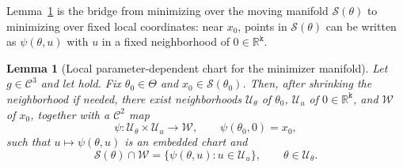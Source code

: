 \documentclass{article}
\theoremstyle{normaltheorem}
\newtheorem{lemma}[lemma]{Lemma}
\newcommand{\dimk}{\texttt{k}}
\newcommand{\R}{\mathbb{R}}
\newcommand{\calS}{\mathcal{S}}
\begin{document}
	Lemma~\ref{lem:parametric-S-chart} is the bridge from minimizing over the moving manifold \(\calS(\theta)\) to
	minimizing over fixed local coordinates: near \(x_0\), points in \(\calS(\theta)\) can be written as
	\(\psi(\theta,u)\) with \(u\) in a fixed neighborhood of \(0\in\R^{\dimk}\).
	\begin{lemma}[Local parameter-dependent chart for the minimizer manifold]\label{lem:parametric-S-chart}
Let \(g\in\mathcal{C}^{3}\) and let  hold. Fix
\(\theta_0\in\Theta\) and \(x_0\in\calS(\theta_0)\). Then, after shrinking the
neighborhood if needed, there exist neighborhoods \(\mathcal U_\theta\) of \(\theta_0\),
		\(\mathcal U_u\) of \(0\in\R^{\dimk}\), and \(\mathcal W\) of \(x_0\), together with a
		\(\mathcal{C}^{2}\) map
		\[
		\psi:\mathcal U_\theta\times\mathcal U_u\to\mathcal W,
		\qquad
		\psi(\theta_0,0)=x_0,
		\]
		such that \(u\mapsto\psi(\theta,u)\) is an embedded chart and
		\[
		\calS(\theta)\cap\mathcal W=\{\psi(\theta,u):u\in\mathcal U_u\},
		\qquad
		\theta\in\mathcal U_\theta .
		\]
		\end{lemma}
\end{document}
